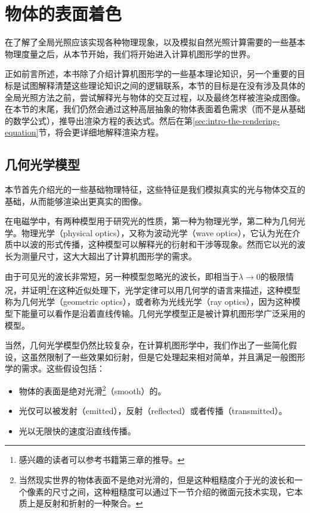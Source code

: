 \section{物体的表面着色}
在了解了全局光照应该实现各种物理现象，以及模拟自然光照计算需要的一些基本物理度量之后，从本节开始，我们将开始进入计算机图形学的世界。

正如前言所述，本书除了介绍计算机图形学的一些基本理论知识，另一个重要的目标是试图解释清楚这些理论知识之间的逻辑联系，本节的目标是在没有涉及具体的全局光照方法之前，尝试解释光与物体的交互过程，以及最终怎样被渲染成图像。在本节的末尾，我们仍然会通过这种高层抽象的物体表面着色需求（而不是从基础的数学公式），推导出渲染方程的表达式。然后在第\ref{sec:intro-the-rendering-equation}节，将会更详细地解释渲染方程。




\subsection{几何光学模型} 
本节首先介绍光的一些基础物理特征，这些特征是我们模拟真实的光与物体交互的基础，从而能够渲染出更真实的图像。

在电磁学中，有两种模型用于研究光的性质，第一种为物理光学，第二种为几何光学。物理光学（physical optics），又称为波动光学（wave optics），它认为光在介质中以波的形式传播，这种模型可以解释光的衍射和干涉等现象。然而它以光的波长为测量尺寸，这大大超出了计算机图形学的需求。

由于可见光的波长非常短，另一种模型忽略光的波长，即相当于$\lambda\to 0$的极限情况，并证明\footnote{感兴趣的读者可以参考书籍\cite{b:PrinciplesofOptics}第三章的推导。}在这种近似处理下，光学定律可以用几何学的语言来描述，这种模型称为几何光学（geometric optics），或者称为光线光学（ray optics），因为这种模型下能量可以看作是沿着直线传输。几何光学模型正是被计算机图形学广泛采用的模型。

当然，几何光学模型仍然比较复杂，在计算机图形学中，我们作出了一些简化假设，这虽然限制了一些效果如衍射，但是它处理起来相对简单，并且满足一般图形学的需求。这些假设包括：

\begin{itemize}
	\item 物体的表面是绝对光滑\footnote{当然现实世界的物体表面不是绝对光滑的，但是这种粗糙度介于光的波长和一个像素的尺寸之间，这种粗糙度可以通过下一节介绍的微面元技术实现，它本质上是反射和折射的一种聚合。}（smooth）的。
	\item 光仅可以被发射（emitted），反射（reflected）或者传播（transmitted）。
	\item 光以无限快的速度沿直线传播。
\end{itemize} 

